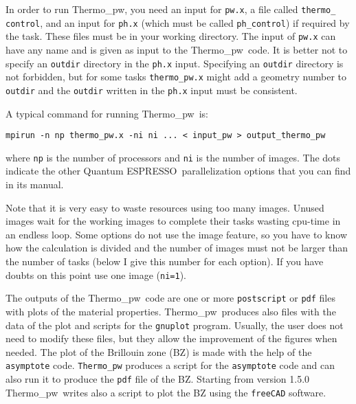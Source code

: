\documentclass[12pt,a4paper,twoside]{report}
\def\qe{{\sc Quantum ESPRESSO}}
\def\thermo{{\sc Thermo}\_{\sc pw}}
\begin{document}
In order to run \thermo, you need an input for \texttt{pw.x},  
a file called \texttt{thermo\_} \texttt{control}, and an input for 
\texttt{ph.x}
(which must be called \texttt{ph\_control}) if required by the task.
 These files must be in your working
directory.
The input of \texttt{pw.x} can have any name and is given as input to
the \thermo\ code. It is better not to specify an \texttt{outdir} 
directory in the \texttt{ph.x} input. Specifying an \texttt{outdir}
directory is not forbidden, but for some tasks \texttt{thermo\_pw.x} 
might add a geometry number to \texttt{outdir} and the
\texttt{outdir} written in the \texttt{ph.x} input must be consistent.

A typical command for running \thermo\ is:

\begin{verbatim}
mpirun -n np thermo_pw.x -ni ni ... < input_pw > output_thermo_pw
\end{verbatim}

where \texttt{np} is the number of processors and \texttt{ni} is the number 
of images. The dots indicate the other \qe\ parallelization options that
you can find in its manual.

Note that it is very easy to waste resources using too many 
images. Unused images wait for the working images to complete
their tasks wasting cpu-time in an endless loop. 
Some options 
do not use the image feature, so you have to know how the calculation 
is divided and the number of images must not
be larger than the number of tasks (below I give this number for each option).
If you have doubts on this point use one image 
(\texttt{ni=1}).

The outputs of the \thermo\ code are one or more \texttt{postscript} or
\texttt{pdf} files 
with plots of the material properties. \thermo\ produces also files with 
the data of 
the plot and scripts for the \texttt{gnuplot} program. 
Usually, the user does not need to modify these files, but they allow 
the improvement of the figures when needed.
The plot of the Brillouin zone (BZ) is made with the help of the 
\texttt{asymptote} code. \texttt{Thermo\_pw} produces a script 
for the \texttt{asymptote} code and can also run it to produce the \texttt{pdf}
file of the BZ. Starting from version 1.5.0 \thermo\ writes also a 
script to plot the BZ using the \texttt{freeCAD} software.

\newpage
\end{document}
